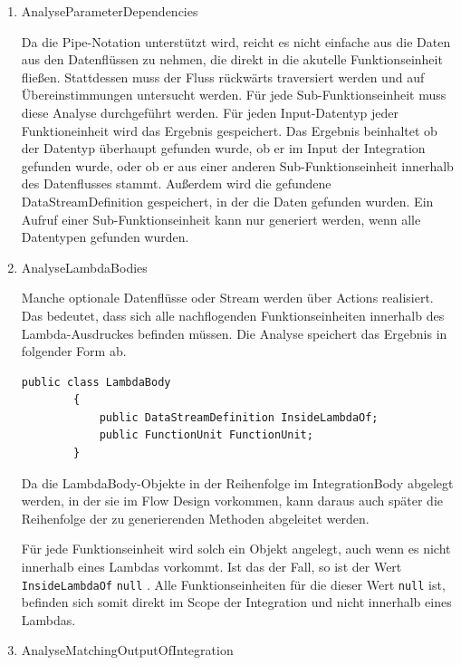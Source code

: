 	\begin{enumerate}
		\item AnalyseParameterDependencies

		Da die Pipe-Notation unterstützt wird, reicht es nicht einfache aus die Daten
		aus den Datenflüssen zu nehmen, die direkt in die akutelle
		Funktionseinheit fließen. Stattdessen muss der Fluss rückwärts
		traversiert werden und auf Übereinstimmungen untersucht werden.
		Für jede Sub-Funktionseinheit muss diese Analyse durchgeführt werden.
		Für jeden Input-Datentyp jeder Funktioneinheit wird das Ergebnis gespeichert. Das Ergebnis beinhaltet ob der Datentyp überhaupt gefunden
		wurde, ob er im Input der Integration gefunden wurde, oder ob er aus einer
		anderen Sub-Funktionseinheit innerhalb des Datenflusses stammt. 
		Außerdem wird die gefundene DataStreamDefinition gespeichert, in der die
		Daten gefunden wurden. Ein Aufruf einer Sub-Funktionseinheit kann nur generiert werden, wenn alle Datentypen gefunden
		wurden.
		
		\item AnalyseLambdaBodies

		Manche optionale Datenflüsse oder Stream werden über Actions realisiert.
		Das bedeutet, dass sich alle nachflogenden Funktionseinheiten innerhalb
		des Lambda-Ausdruckes befinden müssen. Die Analyse speichert das Ergebnis
		in folgender Form ab. 
		
		\begin{lstlisting}[caption=LambdaBody Klasse]
		public class LambdaBody
		{
			public DataStreamDefinition InsideLambdaOf;
			public FunctionUnit FunctionUnit;
		}
		\end{lstlisting}
		
		Da die LambdaBody-Objekte in der Reihenfolge im IntegrationBody abgelegt
		werden, in der sie im Flow Design vorkommen, kann daraus auch später die
		Reihenfolge der zu generierenden Methoden abgeleitet werden.
		
		
		Für jede Funktionseinheit wird solch ein Objekt angelegt, auch wenn es
		nicht innerhalb eines Lambdas vorkommt. Ist das der Fall, so ist der Wert
		\texttt{InsideLambdaOf} \texttt{null} . Alle Funktionseinheiten für die dieser Wert
		\texttt{null} ist, befinden sich somit direkt im Scope der Integration und nicht
		innerhalb eines Lambdas.
		
		\item AnalyseMatchingOutputOfIntegration


\end{enumerate}
